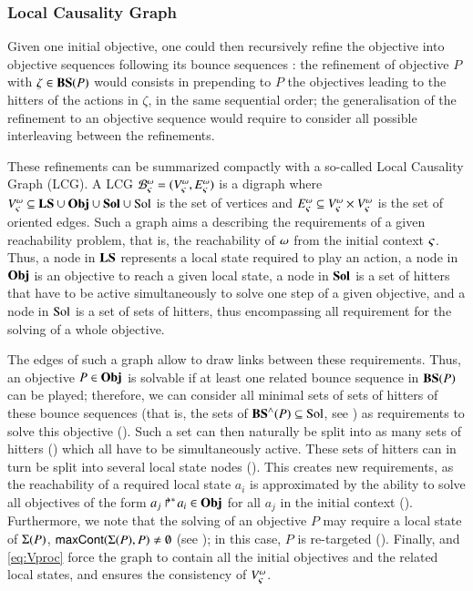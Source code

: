 \subsubsection{Local Causality Graph}

Given one initial objective, one could then recursively refine the objective into objective
sequences following its bounce sequences \cite{PMR12-MSCS}:
the refinement of objective $P$ with $\zeta\in\mathbf{BS}(P)$ would consists in prepending to $P$ the
objectives leading to the hitters of the actions in $\zeta$, in the same sequential order;
the generalisation of the refinement to an objective sequence would require to consider all possible
interleaving between the refinements.

These refinements can be summarized compactly with a so-called Local Causality Graph (LCG).
A LCG $\mathcal{B}^\omega_\varsigma = (V_\varsigma^\omega, E_\varsigma^\omega)$
is a digraph where $V_\varsigma^\omega \subseteq \mathbf{LS} \cup \mathbf{Obj} \cup \mathbf{Sol} \cup \mathrm{Sol}$ is the set of vertices
and $E_\varsigma^\omega \subseteq V_\varsigma^\omega \times V_\varsigma^\omega$ is the set of oriented edges.
Such a graph aims a describing the requirements of a given reachability
problem, that is, the reachability of $\omega$ from the initial context $\varsigma$.
Thus, a node in $\mathbf{LS}$ represents a local state required to play an action,
a node in $\mathbf{Obj}$ is an objective to reach a given local state,
a node in $\mathbf{Sol}$ is a set of hitters that have to be active simultaneously
to solve one step of a given objective,
and a node in $\mathrm{Sol}$ is a set of sets of hitters,
thus encompassing all requirement for the solving of a whole objective.

The edges of such a graph allow to draw links between these requirements.
Thus, an objective $P \in \mathbf{Obj}$ is solvable if
at least one related bounce sequence in $\mathbf{BS}(P)$ can be played;
therefore, we can consider all minimal sets of sets of hitters of these bounce sequences
(that is, the sets of $\mathbf{BS}^\wedge(P) \subseteq \mathrm{Sol}$, see )
as requirements to solve this objective ().
Such a set can then naturally be split into as many sets of hitters ()
which all have to be simultaneously active.
These sets of hitters can in turn be split into several local state nodes ().
This creates new requirements, as the reachability of a required local state $a_i$
is approximated by the ability to solve all objectives of the form
$\mbox{${a}_{j}\Rsh^*\!{a}_{i}$} \in \mathbf{Obj}$ for all $a_j$ in the initial context ().
Furthermore, we note that the solving of an objective $P$ may require
a local state of $\Sigma(P)$,
\ie $\mathsf{maxCont}(\Sigma(P), P) \neq \emptyset$ (see );
in this case, $P$ is re-targeted ().
Finally,  and \eqref{eq:Vproc}
force the graph to contain all the initial objectives
and the related local states,
and  ensures the consistency of $V_\varsigma^\omega$.

